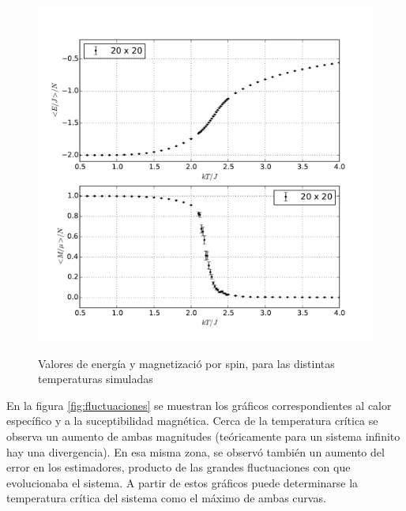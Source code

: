 \documentclass[a4paper,12pt]{article}
\begin{document}
\begin{figure}[H]
    \begin{center}
      \includegraphics[scale=0.7]{val_medios.pdf} \\
      \caption{Valores de energía y magnetizació por spin, para 
      las distintas temperaturas simuladas}\label{fig:val_medios}
    \end{center}
\end{figure}

En la figura \eqref{fig:fluctuaciones} se muestran los gráficos 
correspondientes al calor específico y a la suceptibilidad magnética. Cerca de 
la temperatura crítica se observa un aumento de ambas magnitudes 
(teóricamente para un sistema infinito hay una divergencia). En esa misma zona, 
se observó también un aumento del error en los estimadores, producto de las 
grandes fluctuaciones con que evolucionaba el sistema. A partir de estos 
gráficos puede determinarse la temperatura crítica del sistema como el máximo 
de ambas curvas.
\end{document}
